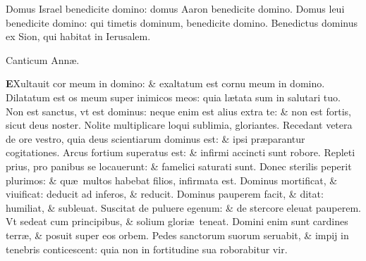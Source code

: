 \documentclass[a5paper,10pt]{book}
\def\ae{æ}
\begin{document}
\begin{multicols*}{2}
\newline \color{red} D\color{black}omus Israel benedicite domino: domus Aaron benedicite domino.
\newline \color{red} D\color{black}omus leui benedicite domino: qui timetis dominum, benedicite domino.
\newline \color{red} B\color{black}enedictus dominus ex Sion, qui habitat in Ierusalem.
\vspace{-1em}
\begin{center} \color{red}
Canticum Ann\ae .
\end{center}
\vspace{-1em}
\lettrine[lines=2]{\bfseries \color{red} E}{}Xultauit cor meum in domino: \& exaltatum est cornu meum in domino.%
\newline \color{red} D\color{black}ilatatum est os meum super inimicos meos: quia l\ae tata sum in salutari tuo.
\newline \color{red} N\color{black}on est sanctus, vt est dominus: neque enim est alius extra te: \& non est fortis, sicut deus noster.
\newline \color{red} N\color{black}olite multiplicare loqui sublimia, gloriantes.
\newline \color{red} R\color{black}ecedant vetera de ore vestro, quia deus scientiarum dominus est: \& ipsi pr\ae parantur cogitationes.
\newline \color{red} A\color{black}rcus fortium superatus est: \& infirmi accincti sunt robore.
\newline \color{red} R\color{black}epleti prius, pro panibus se locauerunt: \& famelici saturati sunt.
\newline \color{red} D\color{black}onec sterilis peperit plurimos: \& qu\ae \ multos habebat filios, infirmata est.
\newline \color{red} D\color{black}ominus mortificat, \& viuificat: deducit ad inferos, \& reducit.
\newline \color{red} D\color{black}ominus pauperem facit, \& ditat: humiliat, \& subleuat.
\newline \color{red} S\color{black}uscitat de puluere egenum: \& de stercore eleuat pauperem.
\newline \color{red} V\color{black}t sedeat cum principibus, \& solium glori\ae \ teneat.
\newline \color{red} D\color{black}omini enim sunt cardines terr\ae , \& posuit super eos orbem.
\newline \color{red} P\color{black}edes sanctorum suorum seruabit, \& impij in tenebris conticescent: quia non in fortitudine sua roborabitur vir.

\end{multicols*}
\end{document}
